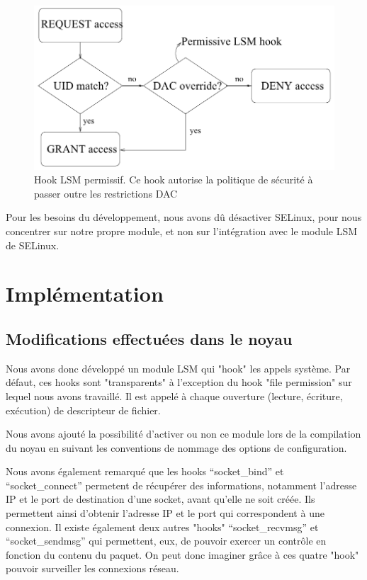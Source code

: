 \documentclass[pdftex,a4paper,titlepage,11pt]{article}
\begin{document}
\newpage

\begin{figure}%
	\centering
	\includegraphics[scale=0.45]{attachements/lsm2.png}
	\caption{Hook LSM permissif. Ce hook autorise la politique de sécurité à passer outre les restrictions DAC \cite{LSMINTRO}}
\end{figure}

Pour les besoins du développement, nous avons dû désactiver SELinux, pour nous concentrer sur notre propre module, et non sur l'intégration avec le module LSM de SELinux.

\newpage

\section{Implémentation}

\subsection{Modifications effectuées dans le noyau}

Nous avons donc développé un module LSM qui "hook" les appels système. Par défaut, ces hooks sont "transparents" à l'exception du hook "file permission" sur lequel nous avons travaillé. Il est appelé à chaque ouverture (lecture, écriture, exécution) de descripteur de fichier.

Nous avons ajouté la possibilité d'activer ou non ce module lors de la compilation du noyau en suivant les conventions de nommage des options de configuration.

Nous avons également remarqué que les hooks ``socket\_bind'' et ``socket\_connect'' permetent de récupérer des informations, notamment l'adresse IP et le port de destination d'une socket, avant qu'elle ne soit créée. Ils permettent ainsi d'obtenir l'adresse IP et le port qui correspondent à une connexion. Il existe également deux autres "hooks" ``socket\_recvmsg'' et ``socket\_sendmsg'' qui permettent, eux, de pouvoir exercer un contrôle en fonction du contenu du paquet. On peut donc imaginer grâce à ces quatre "hook" pouvoir surveiller les connexions réseau.
\end{document}
